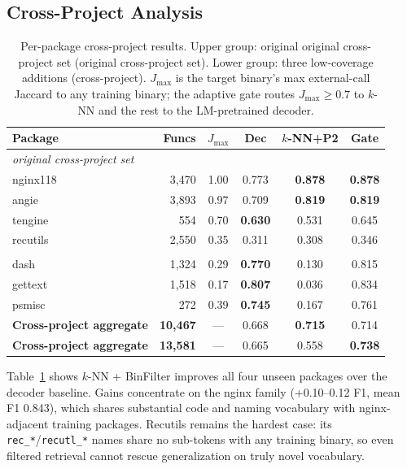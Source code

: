\documentclass[sigconf,nonacm]{acmart}
\begin{document}
\subsection{Cross-Project Analysis}

\begin{table}[t]
    \centering
    \caption{Per-package cross-project results. Upper group: original original cross-project set (original cross-project set). Lower group: three low-coverage additions (cross-project). $J_{\max}$ is the target binary's max external-call Jaccard to any training binary; the adaptive gate routes $J_{\max}\!\ge\!0.7$ to $k$-NN and the rest to the LM-pretrained decoder.}
    \label{tab:perpackage}
    \footnotesize
    \begin{tabular}{lrcccc}
        \toprule
        \textbf{Package} & \textbf{Funcs} & \boldmath$J_{\max}$ & \textbf{Dec} & \textbf{$k$-NN+P2} & \textbf{Gate} \\
        \midrule
        \multicolumn{6}{l}{\emph{original cross-project set}} \\
        nginx118 & 3{,}470 & 1.00 & 0.773 & \textbf{0.878} & \textbf{0.878} \\
        angie    & 3{,}893 & 0.97 & 0.709 & \textbf{0.819} & \textbf{0.819} \\
        tengine  &    554 & 0.70 & \textbf{0.630} & 0.531 & 0.645 \\
        recutils & 2{,}550 & 0.35 & 0.311 & 0.308 & 0.346 \\
        \midrule
        \multicolumn{6}{l}{\emph{}} \\
        dash     & 1{,}324 & 0.29 & \textbf{0.770} & 0.130 & 0.815 \\
        gettext  & 1{,}518 & 0.17 & \textbf{0.807} & 0.036 & 0.834 \\
        psmisc   &    272 & 0.39 & \textbf{0.745} & 0.167 & 0.761 \\
        \midrule
        \textbf{Cross-project aggregate} & \textbf{10{,}467} & --- & 0.668 & \textbf{0.715} & 0.714 \\
        \textbf{Cross-project aggregate} & \textbf{13{,}581} & --- & 0.665 & 0.558 & \textbf{0.738} \\
        \bottomrule
    \end{tabular}
\end{table}

Table~\ref{tab:perpackage} shows $k$-NN + BinFilter improves all four unseen packages over the decoder baseline. Gains concentrate on the nginx family (+0.10--0.12 F1, mean F1 0.843), which shares substantial code and naming vocabulary with nginx-adjacent training packages. Recutils remains the hardest case: its \texttt{rec\_*}/\texttt{recutl\_*} names share no sub-tokens with any training binary, so even filtered retrieval cannot rescue generalization on truly novel vocabulary.
\end{document}
